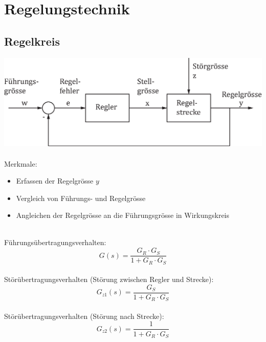 



\chapter{Regelungstechnik}

\section{Regelkreis}
\includegraphics[width = \linewidth]{images/regelkreis.eps}
\\\\
Merkmale:
\begin{itemize}
	\item Erfassen der Regelgrösse $y$
	\item Vergleich von Führungs- und Regelgrösse
	\item Angleichen der Regelgrösse an die Führungsgrösse in Wirkungskreis
\end{itemize}
~\\
Führungsübertragungsverhalten:
\[
	G(s) = \frac{G_R \cdot G_S}{1 + G_R \cdot G_S}
\]
~\\
Störübertragungsverhalten (Störung zwischen Regler und Strecke):
\[
	G_{z1}(s) =\frac{G_S}{1 + G_R \cdot G_S}
\]
~\\
Störübertragungsverhalten (Störung nach Strecke):
\[
	G_{z2}(s) = \frac{1}{1 + G_R \cdot G_S}
\]

